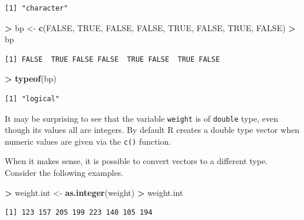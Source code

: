 \documentclass[
]{krantz}
\makeatletter
\newenvironment{Shaded}{\begin{snugshade}}{\end{snugshade}}
\newcommand{\KeywordTok}[1]{\textcolor[rgb]{0.27,0.27,0.27}{\textbf{#1}}}
\newcommand{\NormalTok}[1]{#1}
\newcommand{\OperatorTok}[1]{\textcolor[rgb]{0.43,0.43,0.43}{\textbf{#1}}}
\newcommand{\OtherTok}[1]{\textcolor[rgb]{0.37,0.37,0.37}{#1}}
\newcommand{\StringTok}[1]{\textcolor[rgb]{0.5,0.5,0.5}{#1}}
\newenvironment{kframe}{%
\medskip{}
\setlength{\fboxsep}{.8em}
 \def\at@end@of@kframe{}%
 \ifinner\ifhmode%
  \def\at@end@of@kframe{\end{minipage}}%
  \begin{minipage}{\columnwidth}%
 \fi\fi%
 \def\FrameCommand##1{\hskip\@totalleftmargin \hskip-\fboxsep
 \colorbox{shadecolor}{##1}\hskip-\fboxsep
     \hskip-\linewidth \hskip-\@totalleftmargin \hskip\columnwidth}%
 \MakeFramed {\advance\hsize-\width
   \@totalleftmargin\z@ \linewidth\hsize
   \@setminipage}}%
 {\par\unskip\endMakeFramed%
 \at@end@of@kframe}
\renewenvironment{Shaded}{\begin{kframe}}{\end{kframe}}
\makeatother
\begin{document}
\begin{verbatim}
[1] "character"
\end{verbatim}

\begin{Shaded}
\begin{Highlighting}[]
\OperatorTok{\textgreater{}}\StringTok{ }\NormalTok{bp \textless{}{-}}\StringTok{ }\KeywordTok{c}\NormalTok{(}\OtherTok{FALSE}\NormalTok{, }\OtherTok{TRUE}\NormalTok{, }\OtherTok{FALSE}\NormalTok{, }\OtherTok{FALSE}\NormalTok{, }\OtherTok{TRUE}\NormalTok{, }\OtherTok{FALSE}\NormalTok{, }\OtherTok{TRUE}\NormalTok{, }\OtherTok{FALSE}\NormalTok{)}
\OperatorTok{\textgreater{}}\StringTok{ }\NormalTok{bp}
\end{Highlighting}
\end{Shaded}

\begin{verbatim}
[1] FALSE  TRUE FALSE FALSE  TRUE FALSE  TRUE FALSE
\end{verbatim}

\begin{Shaded}
\begin{Highlighting}[]
\OperatorTok{\textgreater{}}\StringTok{ }\KeywordTok{typeof}\NormalTok{(bp)}
\end{Highlighting}
\end{Shaded}

\begin{verbatim}
[1] "logical"
\end{verbatim}

It may be surprising to see that the variable \texttt{weight} is of \texttt{double} type, even though its values all are integers. By default R creates a double type vector when numeric values are given via the \texttt{c()} function.

When it makes sense, it is possible to convert vectors to a different type. Consider the following examples.

\begin{Shaded}
\begin{Highlighting}[]
\OperatorTok{\textgreater{}}\StringTok{ }\NormalTok{weight.int \textless{}{-}}\StringTok{ }\KeywordTok{as.integer}\NormalTok{(weight)}
\OperatorTok{\textgreater{}}\StringTok{ }\NormalTok{weight.int}
\end{Highlighting}
\end{Shaded}

\begin{verbatim}
[1] 123 157 205 199 223 140 105 194
\end{verbatim}
\end{document}
